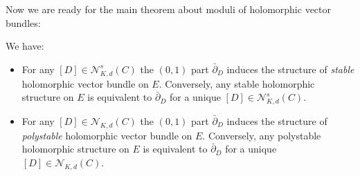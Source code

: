 \documentclass[12pt,letterpaper,reqno]{article}
\numberwithin{equation}{section}
\newcommand{\cN}{\ensuremath{\mathcal N}}
\newcommand{\ti}[1]{\textit{#1}}
\begin{document}
Now we are ready for the main theorem about moduli of holomorphic 
vector bundles:

\begin{thm}  \label{thm:narasimhan-seshadri}
\cite{MR32:1725}
We have:
\begin{itemize}
\item For any $[D] \in \cN^s_{K,d}(C)$ the $(0,1)$ part $\bar\partial_D$
induces the structure of \ti{stable} holomorphic vector bundle on $E$.
Conversely, any stable holomorphic structure
on $E$ is equivalent to $\bar\partial_D$ for a unique $[D] \in \cN^s_{K,d}(C)$.
\item For any $[D] \in \cN_{K,d}(C)$ the $(0,1)$ part $\bar\partial_D$
induces the structure of \ti{polystable} holomorphic vector bundle on $E$.
Conversely, any polystable holomorphic structure
on $E$ is equivalent to $\bar\partial_D$ for a unique $[D] \in \cN_{K,d}(C)$.
\end{itemize}
\end{thm}
\end{document}
